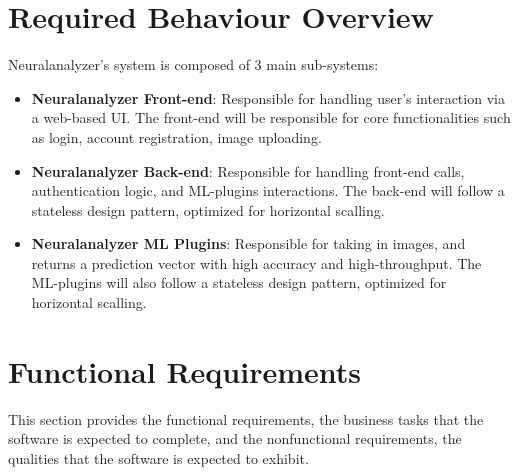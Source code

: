 \documentclass[12pt]{article}
\begin{document}
\section{Required Behaviour Overview}
Neuralanalyzer's system is composed of 3 main sub-systems:
\begin{itemize}
    \item \textbf{Neuralanalyzer Front-end}: Responsible for handling user's interaction via a web-based UI. The front-end will be responsible for core functionalities such as login, account registration, image uploading.
    \item \textbf{Neuralanalyzer Back-end}: Responsible for handling front-end calls, authentication logic, and ML-plugins interactions. The back-end will follow a stateless design pattern, optimized for horizontal scalling.
    \item \textbf{Neuralanalyzer ML Plugins}: Responsible for taking in images, and returns a prediction vector with high accuracy and high-throughput. The ML-plugins will also follow a stateless design pattern, optimized for horizontal scalling.
\end{itemize}

  \clearpage
\section{Functional Requirements}
This section provides the functional requirements, the business tasks that the
software is expected to complete, and the nonfunctional requirements, the
qualities that the software is expected to exhibit.
\end{document}

